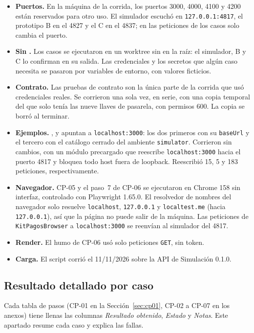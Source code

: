 \begin{itemize}
  \item \textbf{Puertos.} En la máquina de la corrida, los puertos 3000, 4000, 4100 y 4200 están reservados para otro uso. El simulador escuchó en \texttt{127.0.0.1:4817}, el prototipo B en el 4827 y el C en el 4837; en las peticiones de los casos solo cambia el puerto.
  \item \textbf{Sin .} Los casos se ejecutaron en un worktree sin  en la raíz: el simulador, B y C lo confirman en su salida. Las credenciales y los secretos que algún caso necesita se pasaron por variables de entorno, con valores ficticios.
  \item \textbf{Contrato.} Las pruebas de contrato son la única parte de la corrida que usó credenciales reales. Se corrieron una sola vez, en serie, con una copia temporal del  que solo tenía las nueve llaves de pasarela, con permisos 600. La copia se borró al terminar.
  \item \textbf{Ejemplos.} ,  y  apuntan a \texttt{localhost:3000}: los dos primeros con su \texttt{baseUrl} y el tercero con el catálogo cerrado del ambiente \texttt{simulator}. Corrieron sin cambios, con un módulo precargado que reescribe \texttt{localhost:3000} hacia el puerto 4817 y bloquea todo host fuera de loopback. Reescribió 15, 5 y 183 peticiones, respectivamente.
  \item \textbf{Navegador.} CP-05 y el paso~7 de CP-06 se ejecutaron en Chrome 158 sin interfaz, controlado con Playwright 1.65.0. El resolvedor de nombres del navegador solo resuelve \texttt{localhost}, \texttt{127.0.0.1} y \texttt{localtest.me} (hacia \texttt{127.0.0.1}), así que la página no puede salir de la máquina. Las peticiones de \texttt{KitPagosBrowser} a \texttt{localhost:3000} se reenvían al simulador del 4817.
  \item \textbf{Render.} El humo de CP-06 usó solo peticiones \texttt{GET}, sin token.
  \item \textbf{Carga.} El script corrió el 11/11/2026 sobre la API de Simulación 0.1.0.
\end{itemize}

\subsection{Resultado detallado por caso}
\label{sec:resultado-por-caso}

Cada tabla de pasos (CP-01 en la Sección~\ref{sec:cp01}, CP-02 a CP-07 en los anexos) tiene llenas las columnas \emph{Resultado obtenido}, \emph{Estado} y \emph{Notas}. Este apartado resume cada caso y explica las fallas.

